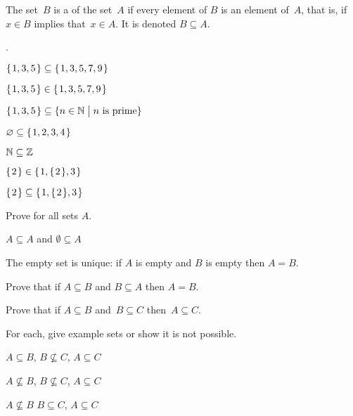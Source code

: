 \documentclass{ibl}
\begin{document}
\begin{df}
The set~$B$ is a  of the set~$A$
if every element of $B$ is an element of~$A$,
that is, if $x\in B$ implies that~$x\in A$.
It is denoted $B\subseteq A$.
\end{df}

\begin{ex} \pord.
\begin{exes}
\item $\mbox{$\{\hspace{0.1em}1,3,5\hspace{0.1em}\}$}\subseteq\mbox{$\{\hspace{0.1em}1,3, 5, 7, 9\hspace{0.1em}\}$}$
\item $\mbox{$\{\hspace{0.1em}1, 3, 5\hspace{0.1em}\}$}\in\mbox{$\{\hspace{0.1em}1, 3, 5, 7, 9\hspace{0.1em}\}$}$   
\item $\mbox{$\{\hspace{0.1em}1,3,5\hspace{0.1em}\}$}\subseteq\{n\in\mathbb{N} \bigm| \text{$n$ is prime}\}$
\item $\varnothing\subseteq\mbox{$\{\hspace{0.1em}1, 2, 3, 4\hspace{0.1em}\}$}$
\item $\mathbb{N}\subseteq\mathbb{Z}$
\item $\mbox{$\{\hspace{0.1em}2\hspace{0.1em}\}$}\in\mbox{$\{\hspace{0.1em}1, \mbox{$\{\hspace{0.1em}2\hspace{0.1em}\}$}, 3\hspace{0.1em}\}$}$
\item $\mbox{$\{\hspace{0.1em}2\hspace{0.1em}\}$}\subseteq\mbox{$\{\hspace{0.1em}1, \mbox{$\{\hspace{0.1em}2\hspace{0.1em}\}$}, 3\hspace{0.1em}\}$}$
\end{exes}
\end{ex}

\begin{ex} Prove for all sets $A$.
\begin{exes}
\item $A\subseteq A$ and $\emptyset\subseteq A$
\item The empty set is unique: if $A$ is empty and $B$ is empty then $A=B$.
\end{exes}
\end{ex}

\begin{ex}
\begin{exes} 
\item {}
  Prove that if $A\subseteq B$ and $B\subseteq A$ then $A=B$.  
\item {}
  Prove that if $A\subseteq B$ and~$B\subseteq C$ then~$A\subseteq C$.  
\end{exes}
\end{ex}

\begin{ex} For each, give example sets or show it is not possible.
\begin{exes}
\item $A\subseteq B$, $B\not\subseteq C$, $A\subseteq C$
\item $A\not\subseteq B$, $B\not\subseteq C$, $A\subseteq C$
\item $A\not\subseteq B$ $B\subseteq C$, $A\subseteq C$    
\end{exes}
\end{ex}
\end{document}
